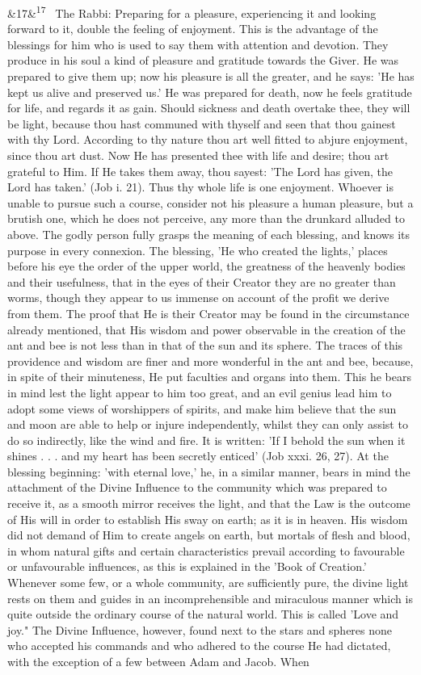 \documentclass[12pt]{article}
\newcommand{\para}[1][]{\par\noindent\ifx&#1&\else\textsuperscript{\footnotesize #1}~\fi}
\begin{document}
\para[17] The Rabbi: Preparing for a pleasure, experiencing it and looking forward to it, double the feeling of enjoyment. This is the advantage of the blessings for him who is used to say them with attention and devotion. They produce in his soul a kind of pleasure and gratitude towards the Giver. He was prepared to give them up; now his pleasure is all the greater, and he says: 'He has kept us alive and preserved us.' He was prepared for death, now he feels gratitude for life, and regards it as gain. Should sickness and death overtake thee, they will be light, because thou hast communed with thyself and seen that thou gainest with thy Lord. According to thy nature thou art well fitted to abjure enjoyment, since thou art dust. Now He has presented thee with life and desire; thou art grateful to Him. If He takes them away, thou sayest: 'The Lord has given, the Lord has taken.' (Job i. 21). Thus thy whole life is one enjoyment. Whoever is unable to pursue such a course, consider not his pleasure a human pleasure, but a brutish one, which he does not perceive, any more than the drunkard alluded to above. The godly person fully grasps the meaning of each blessing, and knows its purpose in every connexion. The blessing, 'He who created the lights,' places before his eye the order of the upper world, the greatness of the heavenly bodies and their usefulness, that in the eyes of their Creator they are no greater than worms, though they appear to us immense on account of the profit we derive from them. The proof that He is their Creator may be found in the circumstance already mentioned, that His wisdom and power observable in the creation of the ant and bee is not less than in that of the sun and its sphere. The traces of this providence and wisdom are finer and more wonderful in the ant and bee, because, in spite of their minuteness, He put faculties and organs into them. This he bears in mind lest the light appear to him too great, and an evil genius lead him to adopt some views of worshippers of spirits, and make him believe that the sun and moon are able to help or injure independently, whilst they can only assist to do so indirectly, like the wind and fire. It is written: 'If I behold the sun when it shines . . . and my heart has been secretly enticed' (Job xxxi. 26, 27). At the blessing beginning: 'with eternal love,' he, in a similar manner, bears in mind the attachment of the Divine Influence to the community which was prepared to receive it, as a smooth mirror receives the light, and that the Law is the outcome of His will in order to establish His sway on earth; as it is in heaven. His wisdom did not demand of Him to create angels on earth, but mortals of flesh and blood, in whom natural gifts and certain characteristics prevail according to favourable or unfavourable influences, as this is explained in the 'Book of Creation.' Whenever some few, or a whole community, are sufficiently pure, the divine light rests on them and guides in an incomprehensible and miraculous manner which is quite outside the ordinary course of the natural world. This is called 'Love and joy." The Divine Influence, however, found next to the stars and spheres none who accepted his commands and who adhered to the course He had dictated, with the exception of a few between Adam and Jacob. When 
\end{document}
